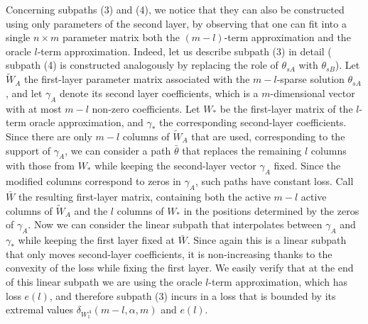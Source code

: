 Concerning subpaths (3) and (4), we notice that they can also be constructed using only parameters of the second layer, 
by observing that one can fit into a single $n \times m$ parameter matrix both the 
$(m-l)$-term approximation and the oracle $l$-term approximation. 
Indeed, let us describe subpath (3) in detail ( subpath (4) is constructed analogously by replacing the role of $\theta_{sA}$ 
with $\theta_{sB}$). Let $\tilde{W}_A$ the first-layer parameter matrix associated with the 
$m-l$-sparse solution $\theta_{sA}$, and let $\gamma_A$ denote its second layer coefficients, which is a $m$-dimensional vector
with at most $m-l$ non-zero coefficients. 
Let $W_{*}$ be the first-layer matrix of the $l$-term oracle approximation, and $\gamma_{*}$ the corresponding second-layer coefficients. 
Since there are only $m-l$ columns of $\tilde{W}_A$ that are used, corresponding to the support of $\gamma_A$, we can 
consider a path $\bar{\theta}$ that replaces the remaining $l$ columns with those from $W_{*}$ while keeping the second-layer vector $\gamma_A$ fixed. Since the modified columns correspond to zeros in $\gamma_A$, such paths have constant loss. 
Call $\bar{W}$ the resulting first-layer matrix, containing both the active $m-l$ active columns of $\tilde{W}_A$ and the $l$ columns of $W_{*}$ in the positions determined by the zeros of $\gamma_A$. 
Now we can consider the linear subpath that interpolates between $\gamma_A$ and $\gamma_{*}$ while keeping the first layer fixed at $\bar{W}$. 
Since again this is a linear subpath that only moves second-layer coefficients, it is non-increasing thanks to the convexity of the loss while fixing the first layer. We easily verify that at the end of this linear subpath we are using the oracle $l$-term approximation, which has loss $e(l)$, and therefore 
subpath (3) incurs in a loss that is bounded by its extremal values $\delta_{W_1^A}(m-l, \alpha, m)$ and $e(l)$. 


